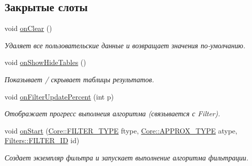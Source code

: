 \subsection*{Закрытые слоты}
\begin{DoxyCompactItemize}
\item 
void \hyperlink{class_main_window_ab1db88110806edae5fc7a1d7a24267f7}{on\+Clear} ()\hypertarget{class_main_window_ab1db88110806edae5fc7a1d7a24267f7}{}\label{class_main_window_ab1db88110806edae5fc7a1d7a24267f7}

\begin{DoxyCompactList}\small\item\em Удаляет все пользовательские данные и возвращает значения по-\/умолчанию. \end{DoxyCompactList}\item 
void \hyperlink{class_main_window_a2df38aeb37f3c82c5523be3ef2731404}{on\+Show\+Hide\+Tables} ()\hypertarget{class_main_window_a2df38aeb37f3c82c5523be3ef2731404}{}\label{class_main_window_a2df38aeb37f3c82c5523be3ef2731404}

\begin{DoxyCompactList}\small\item\em Показывает / скрывает таблицы результатов. \end{DoxyCompactList}\item 
void \hyperlink{class_main_window_aa5a210bb2bc29cb3f7d5d205ae215dbf}{on\+Filter\+Update\+Percent} (int p)\hypertarget{class_main_window_aa5a210bb2bc29cb3f7d5d205ae215dbf}{}\label{class_main_window_aa5a210bb2bc29cb3f7d5d205ae215dbf}

\begin{DoxyCompactList}\small\item\em Отображает прогресс выполнеия алгоритма (связывается с Filter). \end{DoxyCompactList}\item 
void \hyperlink{class_main_window_a16686da6ed1d113106f9dc24694db2b9}{on\+Start} (\hyperlink{namespace_core_af88278693f3c866f217da796f4bb9af7}{Core\+::\+F\+I\+L\+T\+E\+R\+\_\+\+T\+Y\+PE} ftype, \hyperlink{namespace_core_acd67f53ff1d9b21fabb1da4474a8f7d9}{Core\+::\+A\+P\+P\+R\+O\+X\+\_\+\+T\+Y\+PE} atype, \hyperlink{namespace_filters_a1b615faac44ef992d0af44da40ff26d7}{Filters\+::\+F\+I\+L\+T\+E\+R\+\_\+\+ID} id)
\begin{DoxyCompactList}\small\item\em Создает экземпляр фильтра и запускает выполнение алгоритма фильтрации. \end{DoxyCompactList}\end{DoxyCompactItemize}
